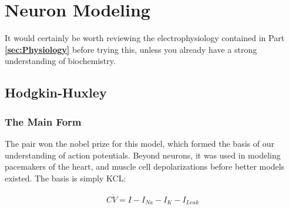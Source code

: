



\chapter{Neuron Modeling}

It would certainly be worth reviewing the electrophysiology contained in Part \textbf{\ref{sec:Physiology}} before trying this, unless you already have a strong understanding of biochemistry.  


\section{Hodgkin-Huxley} 

\subsection{The Main Form} The pair won the nobel prize for this model, which formed the basis of our understanding of action potentials. Beyond neurons, it was used in modeling pacemakers of the heart, and muscle cell depolarizations before better models existed.  The basis is simply KCL: 

\bigskip

\begin{equation} \label{hh1}
\begin{split}
C\dot{V} = I - I_{Na} - I_{K} - I_{Leak}
\end{split}
\end{equation}

\bigskip

